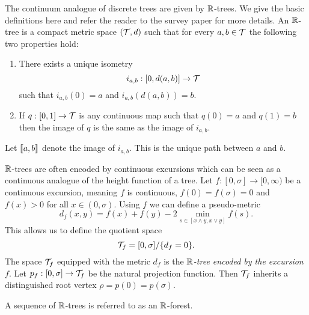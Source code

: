 The continuum analogue of discrete trees are given by ${\mathbb R}$-trees. We give the basic definitions here and refer the reader to the survey paper \cite{legallRandomTreesApplications2005} for more details. An ${\mathbb R}$-tree is a compact metric space $({\mathcal T}, d)$ such that for every $a, b \in {\mathcal T}$ the following two properties hold:
\begin{enumerate}
    \item There exists a unique isometry $$i_{a, b} : [0, d(a, b)] \to {\mathcal T}$$ such that $i_{a, b}(0) = a$ and $i_{a, b}(d(a, b)) = b$.
    \item If $q: [0, 1] \to {\mathcal T}$ is any continuous map such that $q(0) = a$ and $q(1) = b$ then the image of $q$ is the same as the image of $i_{a, b}$.
\end{enumerate}
Let $\llbracket a, b\rrbracket$ denote the image of $i_{a, b}$. This is the unique path between $a$ and $b$.

${\mathbb R}$-trees are often encoded by continuous excursions which can be seen as a continuous analogue of the height function of a tree. Let $f: [0, \sigma] \to [0, \infty)$ be a continuous excursion, meaning $f$ is continuous, $f(0) = f(\sigma) = 0$ and $f(x) > 0$ for all $x \in (0, \sigma)$. Using $f$ we can define a pseudo-metric
\begin{equation*}
    d_f(x, y) = f(x) + f(y) - 2 \min_{s \in [x \wedge y, x \vee y]} f(s).
\end{equation*}
This allows us to define the quotient space
\begin{equation*}
    {\mathcal T}_f = [0, \sigma] / \{d_f = 0\}.
\end{equation*}
The space ${\mathcal T}_f$ equipped with the metric $d_f$ is the \emph{${\mathbb R}$-tree encoded by the excursion $f$}. Let $p_f: [0, \sigma] \to {\mathcal T}_f$ be the natural projection function. Then ${\mathcal T}_f$ inherits a distinguished root vertex $\rho = p(0) = p(\sigma)$.

A sequence of ${\mathbb R}$-trees is referred to as an ${\mathbb R}$-forest.